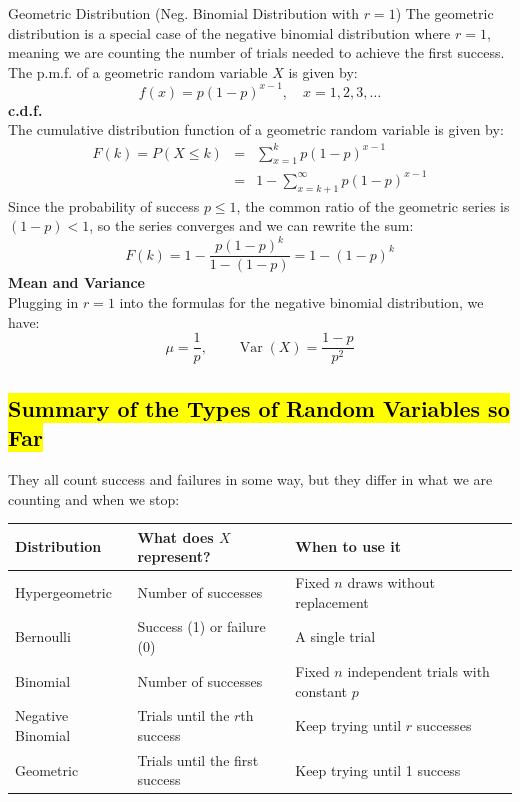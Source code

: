 ﻿\documentclass[12pt]{article}
\begin{document}
\begin{definition}{Geometric Distribution (Neg. Binomial Distribution with $r=1$)}
The geometric distribution is a special case of the negative binomial distribution where $r=1$, meaning we are counting the number of trials needed to achieve the first success. The p.m.f. of a geometric random variable $X$ is given by:
\[f(x) = p(1-p)^{x-1}, \quad x = 1, 2, 3, \ldots\]
\textbf{c.d.f.}\\
The cumulative distribution function of a geometric random variable is given by:
\begin{eqnarray*}
    F(k) = P(X \leq k) &=& \sum_{x=1}^{k} p(1-p)^{x-1} \\
    &=& 1 - \sum_{x=k+1}^{\infty} p(1-p)^{x-1} 
\end{eqnarray*}
Since the probability of success $p\leq 1$, the common ratio of the geometric series is \\$(1-p)<1$, so the series converges and we can rewrite the sum:
\[F(k) = 1 - \frac{p(1-p)^k}{1-(1-p)} = \boxed{1 - (1-p)^k}\]
\textbf{Mean and Variance}\\
Plugging in $r=1$ into the formulas for the negative binomial distribution, we have:
\[
\boxed{\mu=\frac1p,\qquad \operatorname{Var}(X)=\frac{1-p}{p^2}}
\]
\end{definition}
\subsection*{\hl{Summary of the Types of Random Variables so Far}}
They all count success and failures in some way, but they differ in what we are counting and when we stop:
\begin{center}
\begin{tabular}{lll}
\hline
\textbf{Distribution} & \textbf{What does $X$ represent?} & \textbf{When to use it} \\
\hline
Hypergeometric & Number of successes & Fixed $n$ draws without replacement \\
Bernoulli & Success (1) or failure (0) & A single trial \\
Binomial & Number of successes & Fixed $n$ independent trials with constant $p$ \\
Negative Binomial & Trials until the $r$th success & Keep trying until $r$ successes \\
Geometric & Trials until the first success & Keep trying until 1 success \\
\hline
\end{tabular}
\end{center}
\end{document}
